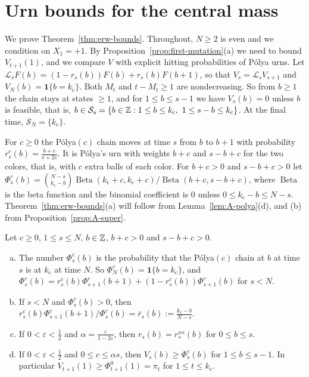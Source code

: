 \section{Urn bounds for the central mass}\label{app:erw}

We prove Theorem~\ref{thm:erw-bounds}. Throughout, $N\ge2$
is even and we condition on $X_1=+1$. By
Proposition~\ref{prop:first-mutation}(a) we need to bound $V_{t+1}(1)$, and we
compare $V$ with explicit hitting probabilities of P\'olya urns. Let
$\mathcal L_sF(b)=(1-r_s(b))F(b)+r_s(b)F(b+1)$, so that $V_s=\mathcal L_sV_{s+1}$ and $V_N(b)=\mathbf 1\{b={k_{\mathrm c}}\}$. Both $M_t$
and $t-M_t\ge1$ are nondecreasing. So from $b\ge1$ the chain stays at states
$\ge1$, and for $1\le b\le s-1$ we have $V_s(b)=0$ unless $b$ is feasible, that is,
$b\in\mathcal S_s=\{b\in\mathbb{Z}:1\le b\le {k_{\mathrm c}},\ 1\le s-b\le {k_{\mathrm c}}\}$. At the final time, $\mathcal S_N=\{{k_{\mathrm c}}\}$.

For $c\ge0$ the P\'olya$(c)$ chain moves at time $s$ from $b$ to $b+1$ with
probability $r^c_s(b)=\frac{b+c}{s+2c}$. It is P\'olya's urn with weights
$b+c$ and $s-b+c$ for the two colors, that is, with $c$ extra balls of each
color. For $b+c>0$ and $s-b+c>0$ let
$\Phi^c_s(b)=\binom{N-s}{{k_{\mathrm c}}-b}\operatorname{Beta}({k_{\mathrm c}}+c,{k_{\mathrm c}}+c)/\operatorname{Beta}(b+c,s-b+c)$, where
$\operatorname{Beta}$ is the beta function and the binomial coefficient is $0$ unless
$0\le {k_{\mathrm c}}-b\le N-s$. Theorem~\ref{thm:erw-bounds}(a) will follow from
Lemma~\ref{lem:A-polya}(d), and (b) from Proposition~\ref{prop:A-super}.

\begin{lemma}\label{lem:A-polya}
Let $c\ge0$, $1\le s\le N$, $b\in\mathbb{Z}$, $b+c>0$ and $s-b+c>0$.
\begin{enumerate}[(a)]
\item The number $\Phi^c_s(b)$ is the probability that the P\'olya$(c)$
chain at $b$ at time $s$ is at ${k_{\mathrm c}}$ at time $N$. So $\Phi^c_N(b)=\mathbf 1\{b={k_{\mathrm c}}\}$, and
$\Phi^c_s(b)=r^c_s(b)\Phi^c_{s+1}(b+1)+(1-r^c_s(b))\Phi^c_{s+1}(b)$ for
$s<N$.
\item If $s<N$ and $\Phi^c_s(b)>0$, then
$r^c_s(b)\Phi^c_{s+1}(b+1)/\Phi^c_s(b)=\bar r_s(b):=\frac{{k_{\mathrm c}}-b}{N-s}$.
\item If $0<\varepsilon<\frac12$ and $\alpha=\frac{\varepsilon}{1-2\varepsilon}$,
then $r_s(b)=r^{\alpha s}_s(b)$ for $0\le b\le s$.
\item If $0<\varepsilon<\frac12$ and $0\le c\le\alpha s$, then
$V_s(b)\ge\Phi^c_s(b)$ for $1\le b\le s-1$. In particular
$V_{t+1}(1)\ge\Phi^0_{t+1}(1)=\pi_t$ for $1\le t\le {k_{\mathrm c}}$.
\end{enumerate}
\end{lemma}

